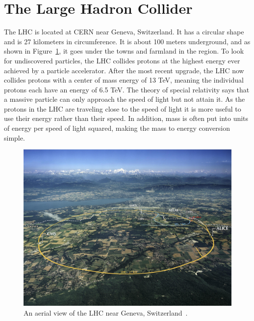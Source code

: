 \section{The Large Hadron Collider}

The LHC is located at CERN near Geneva, Switzerland. It has a circular shape and is 27 kilometers in circumference. It is about 100 meters underground, and as shown in Figure~\ref{fig:LHC}, it goes under the towns and farmland in the region. To look for undiscovered particles, the LHC collides protons at the highest energy ever achieved by a particle accelerator. After the most recent upgrade, the LHC now collides protons with a center of mass energy of 13 TeV, meaning the individual protons each have an energy of 6.5 TeV. The theory of special relativity says that a massive particle can only approach the speed of light but not attain it. As the protons in the LHC are traveling close to the speed of light it is more useful to use their energy rather than their speed. In addition, mass is often put into units of energy per speed of light squared, making the mass to energy conversion simple. 

\begin{figure}
\centering
\includegraphics[width=0.8\linewidth]{Figures/LHC.jpg}
\caption{An aerial view of the LHC near Geneva, Switzerland~\cite{LHC_view}.}
\label{fig:LHC}
\end{figure}

